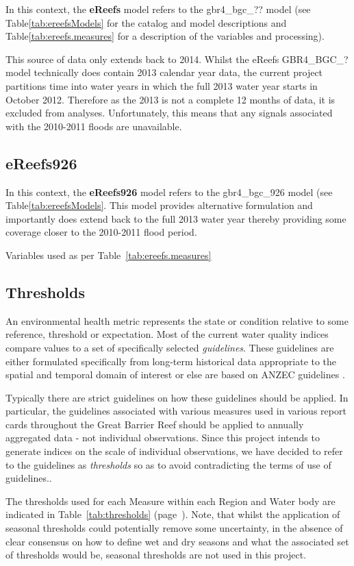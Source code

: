 In this context, the \textbf{eReefs} model refers to the
gbr4\_bgc\_?? model (see Table\ref{tab:ereefsModels} for the catalog and model descriptions and
Table\ref{tab:ereefs.measures} for a description of the variables and processing).

This source of data only extends back to 2014. Whilst the eReefs GBR4\_BGC\_? model technically does
contain 2013 calendar year data, the current project partitions time into water years in which the
full 2013 water year starts in October 2012.  Therefore as the 2013 is not a complete 12 months of
data, it is excluded from analyses. Unfortunately, this means that any signals associated with the
2010-2011 floods are unavailable.
 
    
      

\subsection{eReefs926}

In this context, the \textbf{eReefs926} model refers to the
gbr4\_bgc\_926 model (see Table\ref{tab:ereefsModels}. This model provides alternative formulation
and importantly does extend back to the full 2013 water year thereby providing some coverage closer
to the 2010-2011 flood period.

Variables used as per Table~\ref{tab:ereefs.measures}

\subsection{Thresholds}

An environmental health metric represents the state or condition relative to some reference,
threshold or expectation.  Most of the current water quality indices compare values to a set of
specifically selected \textit{guidelines}.  These guidelines are either formulated specifically from
long-term historical data appropriate to the spatial and temporal domain of interest or else are
based on ANZEC guidelines \citep{ANZEC-2000}.
 
Typically there are strict guidelines on how these guidelines should be applied.  In particular, the
guidelines associated with various measures used in various report cards throughout the Great
Barrier Reef should be applied to annually aggregated data - not individual observations.  Since
this project intends to generate indices on the scale of individual observations, we have decided to
refer to the guidelines as \textit{thresholds} so as to avoid contradicting the terms of use of
guidelines..
 
The thresholds used for each Measure within each Region and Water body are indicated in
Table~\ref{tab:thresholds} (page~\pageref{tab:thresholds}).  Note, that whilst the application of
seasonal thresholds could potentially remove some uncertainty, in the absence of clear consensus on
how to define wet and dry seasons and what the associated set of thresholds would be, seasonal
thresholds are not used in this project.

